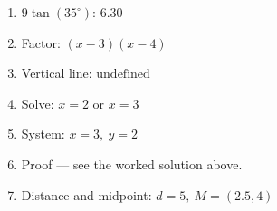 \documentclass[12pt]{article}
\begin{document}

\begin{enumerate}
  \item $9\tan(35^\circ)$: \quad $\boxed{6.30}$
  \item Factor: \quad $\boxed{(x-3)(x-4)}$
  \item Vertical line: \quad $\boxed{\text{undefined}}$
  \item Solve: \quad $\boxed{x = 2 \text{ or } x = 3}$
  \item System: \quad $\boxed{x = 3,\ y = 2}$
  \item Proof — see the worked solution above.
  \item Distance and midpoint: \quad $\boxed{d = 5,\ M = (2.5, 4)}$
\end{enumerate}
\end{document}
